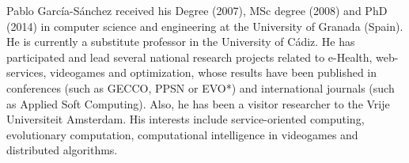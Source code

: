 Pablo García-Sánchez received his Degree (2007), MSc degree (2008) and PhD (2014) in computer science and engineering at the University of Granada (Spain). He is currently a substitute professor in the University of Cádiz. He has participated and lead several national research projects related to e-Health, web-services, videogames and optimization, whose results have been published in conferences (such as GECCO, PPSN or EVO*) and international journals (such as Applied Soft Computing). Also, he has been a visitor researcher to the Vrije Universiteit Amsterdam. His interests include service-oriented computing, evolutionary computation, computational intelligence in videogames and distributed algorithms.